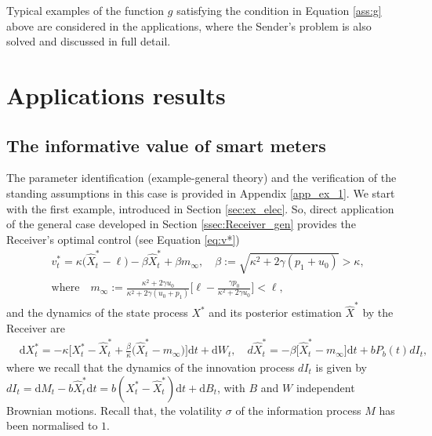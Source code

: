 \documentclass[a4paper,10pt]{article}
\newcommand{\D}{\mathrm{d}}
\theoremstyle{definition}
\theoremstyle{plain}
\numberwithin{equation}{section}
\begin{document}
    Typical examples of the function $g$ satisfying the condition in Equation \eqref{ass:g} above are considered in the applications, where the Sender's problem is also solved and discussed in full detail.

\section{Applications results}\label{sec:apps-sol}
\subsection{The informative value of smart meters}\label{ssec:res-smart}

The parameter identification (example-general theory) and the verification of the standing assumptions in this case is provided in Appendix \ref{app_ex_1}. We start with the first example, introduced in Section \ref{sec:ex_elec}. 
So, direct application of the general case developed in Section \ref{ssec:Receiver_gen} provides the Receiver's optimal control (see Equation \eqref{eq:v*})
\begin{align}\label{opt_contr_energy}
&v^* _t = \kappa \big(\widehat X_t^* - \ell) - \beta \widehat X^\ast_t + \beta m_\infty, 
\quad \beta:= \sqrt{\kappa^2+ 2\gamma (p_1+u_0)} > \kappa, \\ 
& \text{where}  \quad m_\infty :=  \frac{\kappa^2 + 2\gamma u_0 }{\kappa^2+2 \gamma(u_0+p_1)}\Big[\ell - \frac{\gamma p_0}{\kappa^2+2\gamma u_0} \Big] < \ell,
\end{align}
and the dynamics of the state process $X^*$ and its posterior estimation $\widehat X^*$ by the Receiver are
\begin{align*}
&  \D X^\ast_t = -\kappa \Big[ X^\ast_t - \widehat X^\ast_t  + \frac\beta\kappa\big(\widehat X^\ast_t - m_\infty\big)\Big] \D t + \D W_t, \quad
 d\widehat X^\ast_t = -\beta\big[\widehat X^\ast_t - m_\infty \big] \D t + b P_{b} (t) dI_t,
\end{align*}
where we recall that the dynamics of the innovation process $dI_t$ is given by $dI_t = \D M_t - b\widehat X^* _t \D t =  b(X^*_t - \widehat X_t^*)\D t + \D B_t$,
with $B$ and $W$ independent Brownian motions. Recall that,  the volatility $\sigma$ of the information process $M$ has been  normalised to $1$. 
\medskip
\end{document}
